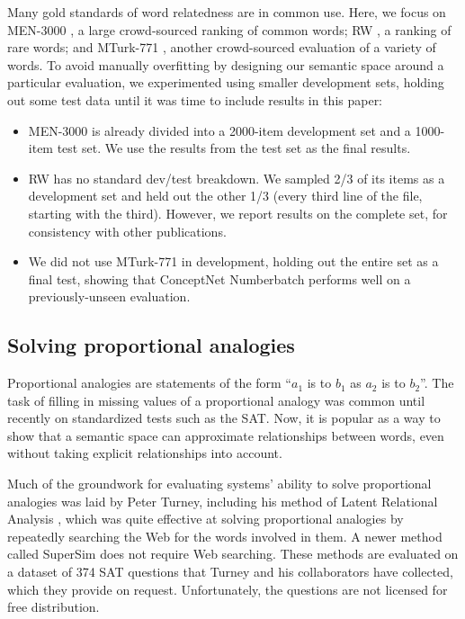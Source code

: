 \documentclass[letterpaper]{article}
\begin{document}
Many gold standards of word relatedness are in common use. Here, we focus on
MEN-3000 \cite{bruni2014men}, a large crowd-sourced ranking of common words; RW
\cite{luong2013rw}, a ranking of rare words; and MTurk-771
\cite{halawi2012mturk}, another crowd-sourced evaluation of a variety of words.
To avoid manually overfitting by designing our semantic space around a
particular evaluation, we experimented using smaller development sets, holding
out some test data until it was time to include results in this paper:

\begin{itemize}
\item
    MEN-3000 is already divided into a 2000-item development set and a
    1000-item test set. We use the results from the test set as the final results.
\item
    RW has no standard dev/test breakdown. We sampled 2/3 of its items as
    a development set and held out the other 1/3 (every third line of the file,
    starting with the third). However, we report results on the complete set,
    for consistency with other publications.
\item
    We did not use MTurk-771 in development, holding out the entire set
    as a final test, showing that ConceptNet Numberbatch performs well on a
    previously-unseen evaluation.
\end{itemize}


\subsection{Solving proportional analogies}

Proportional analogies are statements of the form ``$a_1$ is to $b_1$ as $a_2$
is to $b_2$''. The task of filling in missing values of a proportional analogy
was common until recently on standardized tests such as the SAT. Now, it is
popular as a way to show that a semantic space can approximate relationships
between words, even without taking explicit relationships into account.

Much of the groundwork for evaluating systems' ability to solve proportional
analogies was laid by Peter Turney, including his method of Latent Relational
Analysis \cite{turney2005lra}, which was quite effective at solving
proportional analogies by repeatedly searching the Web for the words involved
in them.  A newer method called SuperSim \cite{turney2013distributional} does
not require Web searching. These methods are evaluated on a dataset of 374 SAT
questions that Turney and his collaborators have collected, which they provide
on request.  Unfortunately, the questions are not licensed for free
distribution.
\end{document}
